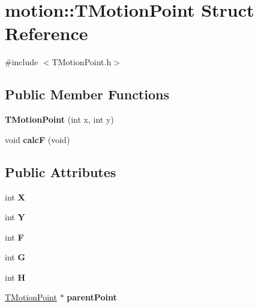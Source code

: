 \hypertarget{structmotion_1_1TMotionPoint}{}\section{motion\+:\+:T\+Motion\+Point Struct Reference}
\label{structmotion_1_1TMotionPoint}


{\ttfamily \#include $<$T\+Motion\+Point.\+h$>$}

\subsection*{Public Member Functions}
\begin{DoxyCompactItemize}
\item 
\mbox{\label{structmotion_1_1TMotionPoint_ac671c6949689e9d7e11ba436f8c0ebe5}} 
{\bfseries T\+Motion\+Point} (int x, int y)
\item 
\mbox{\label{structmotion_1_1TMotionPoint_af8f88551df3a60101405c0ce6051c07c}} 
void {\bfseries calcF} (void)
\end{DoxyCompactItemize}
\subsection*{Public Attributes}
\begin{DoxyCompactItemize}
\item 
\mbox{\label{structmotion_1_1TMotionPoint_a3d6645455449697e1986fadd8400e958}} 
int {\bfseries X}
\item 
\mbox{\label{structmotion_1_1TMotionPoint_a84a88c00dd603ee2069e08959af54ba2}} 
int {\bfseries Y}
\item 
\mbox{\label{structmotion_1_1TMotionPoint_aae598f90740ecff86049be150f0abcf6}} 
int {\bfseries F}
\item 
\mbox{\label{structmotion_1_1TMotionPoint_a9f522ed5aa94537bed714f588d0e439b}} 
int {\bfseries G}
\item 
\mbox{\label{structmotion_1_1TMotionPoint_a5c8839c1d116ac4cf129ba705bb38c76}} 
int {\bfseries H}
\item 
\mbox{\label{structmotion_1_1TMotionPoint_a76f2ee595ccaf8662045ed739cfe12b8}} 
\mbox{\hyperlink{structmotion_1_1TMotionPoint}{T\+Motion\+Point}} $\ast$ {\bfseries parent\+Point}
\end{DoxyCompactItemize}


